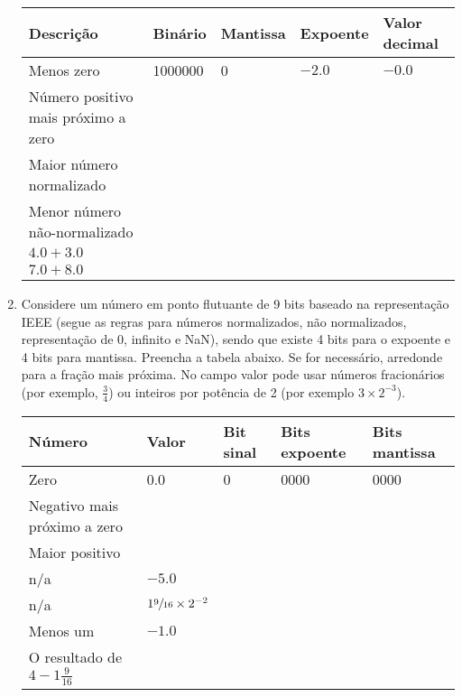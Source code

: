 \begin{enumerate}
    \begin{table}[H]
        \begin{tabular}{|l|l|l|l|l|}
            \hline
            \textbf{Descrição}  & 
            \textbf{Binário}    & 
            \textbf{Mantissa}   &
            \textbf{Expoente}   &
            \textbf{Valor decimal} \\\hline
            Menos zero & 1000000 & 0 & $-2.0$ & $-0.0$ \\\hline
            Número positivo mais próximo a zero & & & & \\\hline
            Maior número normalizado & & & & \\\hline
            Menor número não-normalizado & & & & \\\hline
            $4.0 + 3.0$ & & & & \\\hline
            $7.0 + 8.0$ & & & & \\
            \hline
        \end{tabular}
    \end{table}

    \item
    Considere um número em ponto flutuante de 9 bits 
    baseado na representação IEEE (segue as regras para números normalizados,
    não normalizados, representação de 0, infinito e NaN), sendo que 
    existe 4 bits para o expoente e 4 bits para mantissa.
    Preencha a tabela abaixo.
    Se for necessário, arredonde para a fração mais próxima.
    No campo valor pode usar números fracionários (por exemplo, $\frac{3}{4}$)
    ou inteiros por potência de 2 (por exemplo $3\times2^{-3}$).

    \begin{table}[H]
        \begin{tabular}{|l|l|l|l|l|}
            \hline
            \textbf{Número}  & 
            \textbf{Valor}    & 
            \textbf{Bit sinal}   &
            \textbf{Bits expoente}   &
            \textbf{Bits mantissa} \\\hline
            Zero & 0.0 & 0 & 0000 & 0000 \\\hline
            Negativo mais próximo a zero & & & & \\\hline
            Maior positivo & & & & \\\hline
            n/a & $-5.0$ & & & \\\hline
            n/a & $1\sfrac{9}{16}\times2^{-2}$ & & & \\\hline
            Menos um & $-1.0$ & & & \\\hline
            O resultado de $4-1\frac{9}{16}$ & & & & \\
            \hline
        \end{tabular}
    \end{table}


\end{enumerate}
